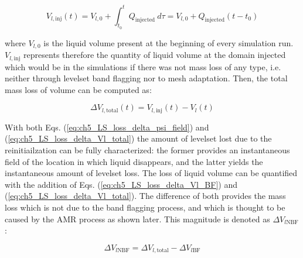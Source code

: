 \begin{equation}
\label{eq:ch5_liquid_volume_injected}
V_{l,\mathrm{inj}} \left( t \right) = V_{l,0} + \int_{t_0}^t Q_\mathrm{injected}~d\tau = V_{l,0} + Q_\mathrm{injected}  \left( t - t_0 \right)
\end{equation}

where $V_{l,0}$ is the liquid volume present at the beginning of every simulation run. $V_{l,\mathrm{inj}}$ represents therefore the quantity of liquid volume at the domain injected which would be in the simulations if there was not mass loss of any type, i.e. neither through levelset band flagging nor to mesh adaptation. Then, the total mass loss of volume can be computed as:

\begin{equation}
\label{eq:ch5_LS_loss_delta_Vl_total}
\Delta V_{l,\mathrm{total}}  \left( t \right)  = V_{l,\mathrm{inj}} \left( t \right) - V_l \left( t \right)
\end{equation}

With both Eqs. (\ref{eq:ch5_LS_loss_delta_psi_field}) and (\ref{eq:ch5_LS_loss_delta_Vl_total}) the amount of levelset lost due to the reinitiailzation can be fully characterized: the former provides an instantaneous field of the location in which liquid disappears, and the latter yields the instantaneous amount of levelset loss. The loss of liquid volume can be quantified with the addition of Eqs. (\ref{eq:ch5_LS_loss_delta_Vl_BF}) and (\ref{eq:ch5_LS_loss_delta_Vl_total}). The difference of both provides the mass loss which is not due to the band flagging process, and which is thought to be caused by the AMR process as shown later. This magnitude is denoted as $\Delta V_{l\mathrm{NBF}}$: 

\begin{equation}
\Delta V_{l\mathrm{NBF}} = \Delta V_{l,\mathrm{total}} - \Delta V_{l\mathrm{BF}}
\end{equation}

